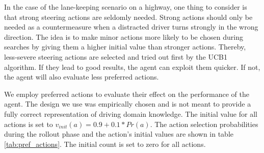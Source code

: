 In the case of the lane-keeping scenario on a highway, one thing to consider is that strong steering actions are seldomly needed. Strong actions should only be needed as a countermeasure when a distracted driver turns strongly in the wrong direction. The idea is to make minor actions more likely to be chosen during searches by giving them a higher initial value than stronger actions. Thereby, less-severe steering actions are selected and tried out first by the UCB1 algorithm. If they lead to good results, the agent can exploit them quicker. If not, the agent will also evaluate less preferred actions. 

We employ preferred actions to evaluate their effect on the performance of the agent. The design we use was empirically chosen and is not meant to provide a fully correct representation of driving domain knowledge. The initial value for all actions is set to  $ v_{init}(a) = 0.9 + 0.1 * Pr(a)$. The action selection probabilities during the rollout phase and the action's initial values are shown in table \ref{tab:pref_actions}. The initial count is set to zero for all actions.

